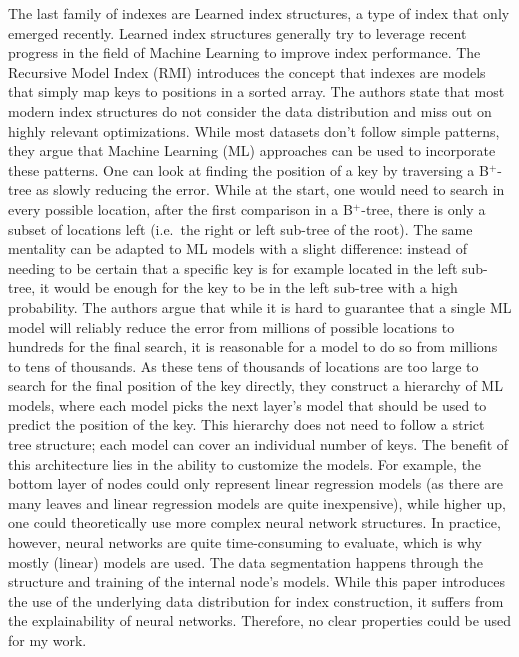 The last family of indexes are Learned index structures, a type of index that only emerged recently. Learned index structures generally try to leverage recent progress in the field of Machine Learning to improve index performance. The Recursive Model Index (RMI) \cite{Kraska2018} introduces the concept that indexes are models that simply map keys to positions in a sorted array. The authors state that most modern index structures do not consider the data distribution and miss out on highly relevant optimizations. While most datasets don't follow simple patterns, they argue that Machine Learning (ML) approaches can be used to incorporate these patterns. One can look at finding the position of a key by traversing a B$^+$-tree as slowly reducing the error. While at the start, one would need to search in every possible location, after the first comparison in a B$^+$-tree, there is only a subset of locations left (i.e.~the right or left sub-tree of the root). The same mentality can be adapted to ML models with a slight difference: instead of needing to be certain that a specific key is for example located in the left sub-tree, it would be enough for the key to be in the left sub-tree with a high probability. The authors argue that while it is hard to guarantee that a single ML model will reliably reduce the error from millions of possible locations to hundreds for the final search, it is reasonable for a model to do so from millions to tens of thousands. As these tens of thousands of locations are too large to search for the final position of the key directly, they construct a hierarchy of ML models, where each model picks the next layer's model that should be used to predict the position of the key. This hierarchy does not need to follow a strict tree structure; each model can cover an individual number of keys. The benefit of this architecture lies in the ability to customize the models. For example, the bottom layer of nodes could only represent linear regression models (as there are many leaves and linear regression models are quite inexpensive), while higher up, one could theoretically use more complex neural network structures. In practice, however, neural networks are quite  time-consuming to evaluate, which is why mostly (linear) models are used. The data segmentation happens through the structure and training of the internal node's models. While this paper introduces the use of the underlying data distribution for index construction, it suffers from the explainability of neural networks. Therefore, no clear properties could be used for my work.


